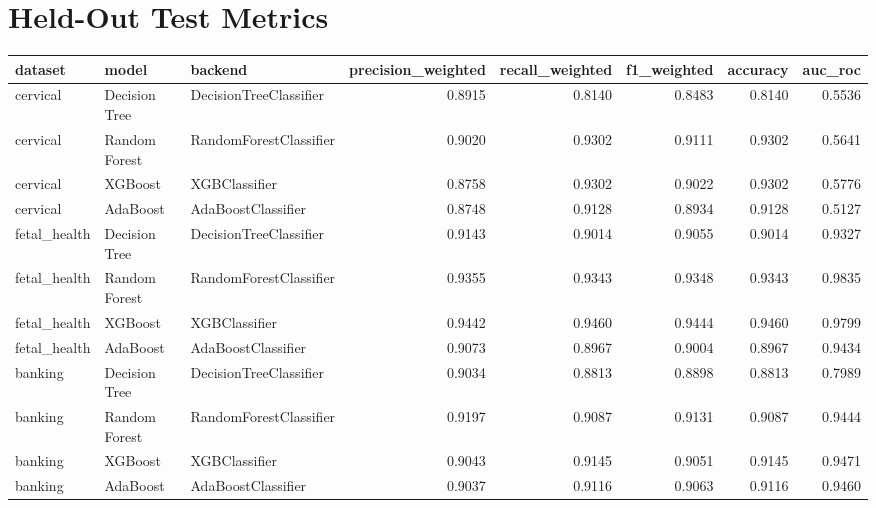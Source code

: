 \documentclass[11pt]{article}
\begin{document}
\section*{Held-Out Test Metrics}
\begin{tabular}{lllrrrrr}
\toprule
      dataset &          model &                 backend &  precision\_weighted &  recall\_weighted &  f1\_weighted &  accuracy &  auc\_roc \\
\midrule
     cervical &  Decision Tree &  DecisionTreeClassifier &              0.8915 &           0.8140 &       0.8483 &    0.8140 &   0.5536 \\
     cervical &  Random Forest &  RandomForestClassifier &              0.9020 &           0.9302 &       0.9111 &    0.9302 &   0.5641 \\
     cervical &        XGBoost &           XGBClassifier &              0.8758 &           0.9302 &       0.9022 &    0.9302 &   0.5776 \\
     cervical &       AdaBoost &      AdaBoostClassifier &              0.8748 &           0.9128 &       0.8934 &    0.9128 &   0.5127 \\
 fetal\_health &  Decision Tree &  DecisionTreeClassifier &              0.9143 &           0.9014 &       0.9055 &    0.9014 &   0.9327 \\
 fetal\_health &  Random Forest &  RandomForestClassifier &              0.9355 &           0.9343 &       0.9348 &    0.9343 &   0.9835 \\
 fetal\_health &        XGBoost &           XGBClassifier &              0.9442 &           0.9460 &       0.9444 &    0.9460 &   0.9799 \\
 fetal\_health &       AdaBoost &      AdaBoostClassifier &              0.9073 &           0.8967 &       0.9004 &    0.8967 &   0.9434 \\
      banking &  Decision Tree &  DecisionTreeClassifier &              0.9034 &           0.8813 &       0.8898 &    0.8813 &   0.7989 \\
      banking &  Random Forest &  RandomForestClassifier &              0.9197 &           0.9087 &       0.9131 &    0.9087 &   0.9444 \\
      banking &        XGBoost &           XGBClassifier &              0.9043 &           0.9145 &       0.9051 &    0.9145 &   0.9471 \\
      banking &       AdaBoost &      AdaBoostClassifier &              0.9037 &           0.9116 &       0.9063 &    0.9116 &   0.9460 \\
\bottomrule
\end{tabular}
\end{document}
